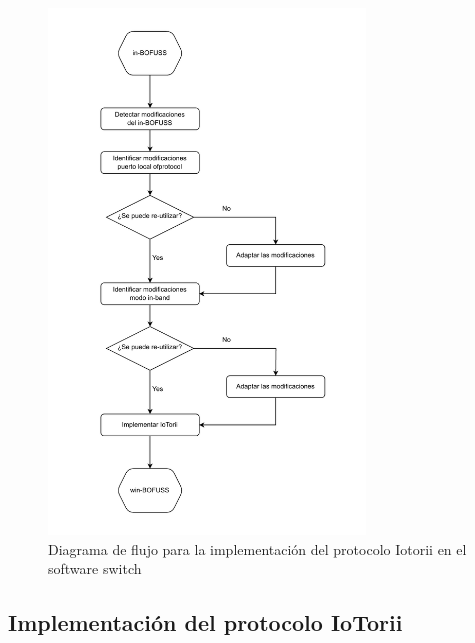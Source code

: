 \begin{figure}[ht!]
    \centering
    \includegraphics[width=0.75\textwidth]{archivos/img/dev/winBOFUSS.pdf}
    \caption{Diagrama de flujo para la implementación del protocolo Iotorii en el software switch }
    \label{fig:WIN-BOFUSS}
\end{figure}

\subsection{Implementación del protocolo IoTorii}

